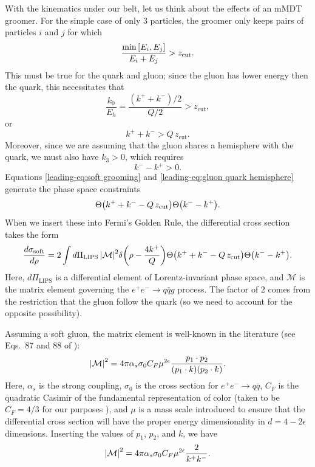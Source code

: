 \documentclass[../thesis.tex]{subfiles}
\providecommand{\zcut}{z_\mathrm{{cut}}}
\providecommand{\LIPS}{\mathrm{LIPS}}
\providecommand{\cM}{\mathcal{M}}
\begin{document}
	With the kinematics under our belt, let us think about the effects of an mMDT groomer. For the simple case of only 3 particles, the groomer only keeps pairs of particles $i$ and $j$ for which \cite{dasgupta_towards_2013,kardos_two-_2020}
	\begin{equation}
		\frac{\min\qty[E_i, E_j]}{E_i + E_j} > \zcut.
	\end{equation}
	This must be true for the quark and gluon; since the gluon has lower energy then the quark, this necessitates that
	\begin{equation}
		\frac{k_0}{E_h} = \frac{(k^+ + k^-)/2}{Q/2} > \zcut,
	\end{equation}
	or
	\begin{equation}\label{leading-eq:soft grooming}
		k^+ + k^- > Q\,\zcut.
	\end{equation}
	Moreover, since we are assuming that the gluon shares a hemisphere with the quark, we must also have $k_3 > 0$, which requires
	\begin{equation}\label{leading-eq:gluon quark hemisphere}
		k^- - k^+ > 0.
	\end{equation}
	Equations \ref{leading-eq:soft grooming} and \ref{leading-eq:gluon quark hemisphere} generate the phase space constraints
	\begin{equation}
		\Theta\qty(k^+ + k^- - Q\,\zcut)\Theta\qty(k^- - k^+).
	\end{equation}
	When we insert these into Fermi's Golden Rule, the differential cross section takes the form
	\begin{equation}\label{leading-eq:soft cross section preliminary}
		\frac{d\sigma_{\text{soft}}}{d\rho} = 2\int d\Pi_\LIPS\,\abs{\cM}^2 \delta\qty(\rho - \frac{4k^+}{Q}) \Theta\qty(k^+ + k^- - Q\,\zcut)\Theta\qty(k^- - k^+).
	\end{equation}
	Here, $d\Pi_\LIPS$ is a differential element of Lorentz-invariant phase space, and $\cM$ is the matrix element governing the $e^+ e^- \to q\bar q g$ process. The factor of $2$ comes from the restriction that the gluon follow the quark (so we need to account for the opposite possibility).

	Assuming a soft gluon, the matrix element is well-known in the literature (see Eqs.\ 87 and 88 of \cite{catani_infrared_2000}):
	\begin{equation}
		\abs{\cM}^2 = 4\pi \alpha_s \sigma_0 C_F \mu^{2\epsilon} \frac{p_1 \cdot p_2}{(p_1 \cdot k)(p_2 \cdot k)}.
	\end{equation}
	Here, $\alpha_s$ is the strong coupling, $\sigma_0$ is the cross section for $e^+ e^- \to q\bar q$, $C_F$ is the quadratic Casimir of the fundamental representation of color (taken to be $C_F = 4/3$ for our purposes \cite{particle_data_group_review_2020}), and $\mu$ is a mass scale introduced to ensure that the differential cross section will have the proper energy dimensionality in $d = 4 - 2\epsilon$ dimensions. Inserting the values of $p_1$, $p_2$, and $k$, we have
	\begin{equation}\label{leading-eq:soft matrix element}
		\abs{\cM}^2 = 4\pi \alpha_s \sigma_0 C_F \mu^{2\epsilon} \frac{2}{k^+ k^-}.
	\end{equation}
\end{document}
